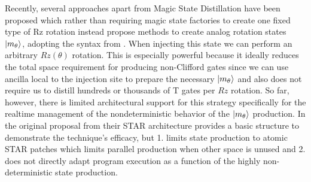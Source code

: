 Recently, several approaches apart from Magic State Distillation have been proposed \cite{akahoshi2023partially, choi2023fault} which rather than requiring magic state factories to create one fixed type of Rz rotation instead propose methods to create analog rotation states $\ket{m_\theta}$, adopting the syntax from \cite{akahoshi2023partially}. When injecting this state we can perform an arbitrary $Rz(\theta)$ rotation. This is especially powerful because it ideally reduces the total space requirement for producing non-Clifford gates since we can use ancilla local to the injection site to prepare the necessary $\ket{m_\theta}$ and also does not require us to distill hundreds or thousands of T gates per $Rz$ rotation. So far, however, there is limited architectural support for this strategy specifically for the realtime management of the nondeterministic behavior of the $\ket{m_\theta}$ production. In the original proposal from \cite{akahoshi2023partially} their STAR architecture provides a basic structure to demonstrate the technique's efficacy, but 1. limits state production to atomic STAR patches which limits parallel production when other space is unused and 2. does not directly adapt program execution as a function of the highly non-deterministic state production. 


